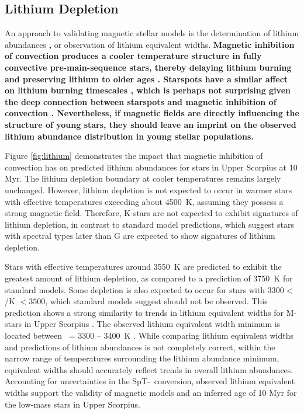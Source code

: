 \documentclass{aa}
\begin{document}
\subsection{Lithium Depletion}
An approach to validating magnetic stellar models is the determination of lithium abundances {\bf \citep{MacDonald2015},} or observation of lithium equivalent widths. {\bf Magnetic inhibition of convection produces a cooler temperature structure in fully convective pre-main-sequence stars, thereby delaying lithium burning and preserving lithium to older ages \citep{Ventura1998, DAntona2000, MM10, FC13, Malo2014, MacDonald2015}. Starspots have a similar affect on lithium burning timescales \citep{Jackson2014b, Somers2015b}, which is perhaps not surprising given the deep connection between starspots and magnetic inhibition of convection \citep{Biermann1941, Deinzer1965}. Nevertheless, if magnetic fields are directly influencing the structure of young stars, they should leave an imprint on the observed lithium abundance distribution in young stellar populations.}
 
Figure \ref{fig:lithium} demonstrates the impact that magnetic inhibition of convection has on predicted lithium abundances for stars in Upper Scorpius at 10 Myr. The lithium depletion boundary at cooler temperatures remains largely unchanged. However, lithium depletion is not expected to occur in warmer stars with effective temperatures exceeding about 4500~K, assuming they possess a strong magnetic field. Therefore, K-stars are not expected to exhibit signatures of lithium depletion, in contrast to standard model predictions, which suggest stars with spectral types later than G are expected to show signatures of lithium depletion. 

Stars with effective temperatures around 3550~K are predicted to exhibit the greatest amount of lithium depletion, as compared to a prediction of 3750~K for standard models. Some depletion is also expected to occur for stars with $3300 <$ \teff/K $< 3500$, which standard models suggest should not be observed. This prediction shows a strong similarity to trends in lithium equivalent widths for M-stars in Upper Scorpius \citep{Rizzuto2015}. The observed lithium equivalent width minimum is located between \teff\ = 3300 -- 3400~K \citep{Rizzuto2015}. While comparing lithium equivalent widths and predictions of lithium abundances is not completely correct, within the narrow range of temperatures surrounding the lithium abundance minimum, equivalent widths should accurately reflect trends in overall lithium abundances. Accounting for uncertainties in the SpT-\teff\ conversion, observed lithium equivalent widths support the validity of magnetic models and an inferred age of 10 Myr for the low-mass stars in Upper Scorpius. 
\end{document}
